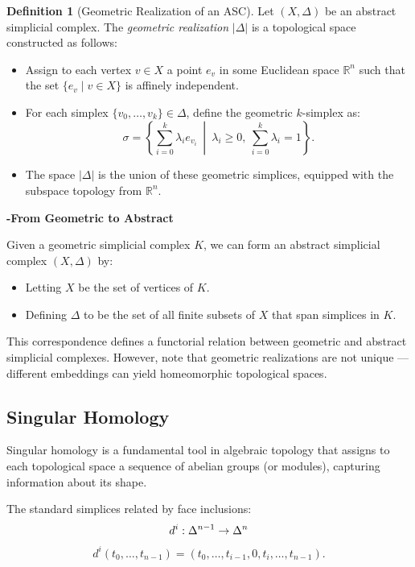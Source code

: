 \documentclass[11pt]{article}
\theoremstyle{definition}
\newtheorem{definition}{Definition}[section]
\theoremstyle{plain}
\begin{document}
\begin{definition}[Geometric Realization of an ASC]
    Let $(X, \Delta)$ be an abstract simplicial complex. The \emph{geometric realization} $|\Delta|$ is a topological space constructed as follows:
    \begin{itemize}
        \item Assign to each vertex $v \in X$ a point $e_v$ in some Euclidean space $\mathbb{R}^n$ such that the set $\{e_v \mid v \in X\}$ is affinely independent.
        \item For each simplex $\{v_0, \dots, v_k\} \in \Delta$, define the geometric $k$-simplex as:
              \[
                  \sigma = \left\{ \sum_{i=0}^{k} \lambda_i e_{v_i} \ \middle| \ \lambda_i \geq 0,\ \sum_{i=0}^{k} \lambda_i = 1 \right\}.
              \]
        \item The space $|\Delta|$ is the union of these geometric simplices, equipped with the subspace topology from $\mathbb{R}^n$.
    \end{itemize}
\end{definition}

\textbf{-From Geometric to Abstract}

Given a geometric simplicial complex $K$, we can form an abstract simplicial complex $(X, \Delta)$ by:
\begin{itemize}
    \item Letting $X$ be the set of vertices of $K$.
    \item Defining $\Delta$ to be the set of all finite subsets of $X$ that span simplices in $K$.
\end{itemize}

This correspondence defines a functorial relation between geometric and abstract simplicial complexes. However, note that geometric realizations are not unique — different embeddings can yield homeomorphic topological spaces.





\subsection{Singular Homology}

Singular homology is a fundamental tool in algebraic topology that assigns to each topological space a sequence of abelian groups (or modules), capturing information about its shape.


The standard simplices related by face inclusions:
\[
    d^i : \Delta^{n-1} \to \Delta^n \\
\]
\[
    d^i(t_0, \ldots, t_{n-1}) = (t_0, \ldots, t_{i-1}, 0, t_i, \ldots, t_{n-1}).
\]
\end{document}
